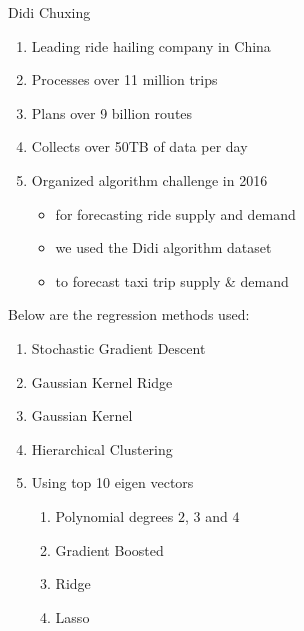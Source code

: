 \documentclass[landscape,a0paper,fontscale=0.285]{baposter} %
\newcommand{\compresslist}{ %
\setlength{\itemsep}{1pt}
\setlength{\parskip}{0pt}
\setlength{\parsep}{0pt}
}
\begin{document}
\begin{poster}
{Didi Chuxing 
\begin{multicols}{2}
\begin{enumerate}\compresslist
\item Leading ride hailing company in China
\item Processes over 11 million trips
\item Plans over 9 billion routes
\item Collects over 50TB of data per day
\item Organized algorithm challenge in 2016 \cite{DidiPage}
\begin{itemize}\compresslist
\item for forecasting ride supply and demand
\item we used the Didi algorithm dataset
\item to forecast taxi trip supply \& demand
\end{itemize}
\end{enumerate}
\end{multicols}
Below are the regression methods used:

\begin{multicols}{2}
\begin{enumerate}\compresslist
\item Stochastic Gradient Descent
\item Gaussian Kernel Ridge 
\item Gaussian Kernel 
\item Hierarchical Clustering\\
\item Using top 10 eigen vectors
\begin{enumerate}\compresslist
\item Polynomial degrees $2$, $3$ and $4$
\item Gradient Boosted 
\item Ridge
\item Lasso
\end{enumerate}
\end{enumerate}
\end{multicols}

\vspace{0.3em} %
}



\end{poster}
\end{document}
